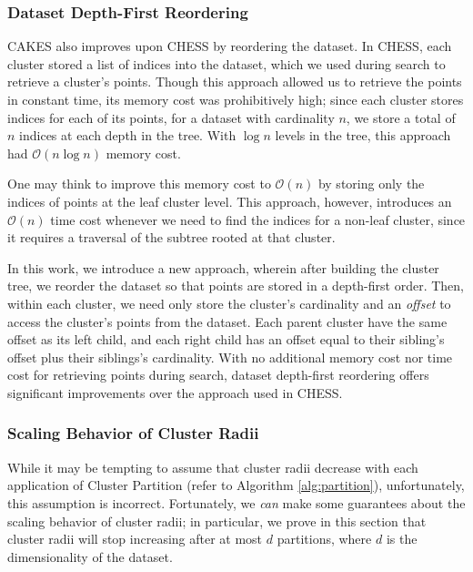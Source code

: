 \subsubsection {Dataset Depth-First Reordering}
\label{subsubsec:methods:dataset-depth-first-reordering}

CAKES also improves upon CHESS by reordering the dataset. In CHESS, each cluster stored a list of indices into the dataset, 
which we used during search to retrieve a cluster's points. 
Though this approach allowed us to retrieve the points in constant 
time, its memory cost was prohibitively high; since each cluster stores indices for each of its
points, for a dataset with cardinality $n$, we store a total of $n$ indices at each depth in the tree.
With $\log{}n$ levels in the tree, this approach had $\mathcal{O}(n\log{}n)$ memory cost. 


One may think to improve this memory cost to $\mathcal{O}(n)$ by storing only the indices of points at 
the leaf cluster level.
This approach, however, introduces an $\mathcal{O}(n)$ time cost whenever we need to find the indices for 
a non-leaf cluster, since it requires a traversal of the subtree rooted at that cluster.


In this work, we introduce a new approach, wherein after building the cluster tree, we reorder the dataset 
so that points are stored in a depth-first order. Then, within each cluster, we need only 
store the cluster's cardinality and an \emph{offset} to access the cluster's points from the dataset. Each parent cluster 
have the same offset as its left child, and each right child has an offset equal to their sibling's offset
plus their siblings's cardinality. With no additional memory cost nor time cost for retrieving points during search, 
dataset depth-first reordering offers significant improvements over the approach used in CHESS.


\subsubsection {Scaling Behavior of Cluster Radii}
\label{subsubsec:methods:guaranteed-decrease-in-cluster-radii}
While it may be tempting to assume that cluster radii decrease with each application of Cluster Partition (refer to Algorithm \ref{alg:partition}), unfortunately, this assumption is incorrect. 
Fortunately, we \emph{can} make some guarantees about the scaling behavior of cluster radii; in particular, we prove in this section that cluster radii will stop increasing after at most 
$d$ partitions, where $d$ is the dimensionality of the dataset. 

